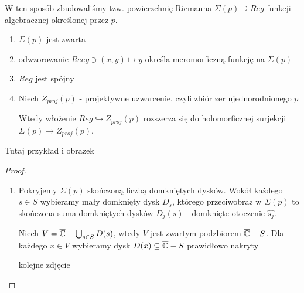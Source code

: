 W ten sposób zbudowaliśmy tzw. powierzchnię Riemanna $\Sigma(p)\supseteq Reg$ funkcji algebracznej określonej przez $p$.

\begin{theorem}{}{}
  \begin{enumerate}
    \item $\Sigma(p)$ jest zwarta
    \item odwzorowanie $Reeg\ni (x,y)\mapsto y$ określa meromorficzną funkcję na $\Sigma(p)$
    \item $Reg$ jest spójny
    \item Niech $Z_{proj}(p)$ - projektywne uzwarcenie, czyli zbiór zer ujednorodnionego $p$

      Wtedy włożenie $Reg\hookrightarrow Z_{proj}(p)$ rozszerza się do holomorficznej surjekcji $\Sigma(p)\to Z_{proj}(p)$.
  \end{enumerate}
\end{theorem}

Tutaj przykład i obrazek

\begin{proof}
  \begin{enumerate}
    \item Pokryjemy $\Sigma(p)$ skończoną liczbą domkniętych dysków. Wokół każdego $s\in S$ wybieramy mały domknięty dysk $D_s$, którego przeciwobraz w $\Sigma(p)$ to skończona suma domkniętych dysków $D_j(s)$ - domknięte otoczenie $\hat{s_j}$.

      Niech $V=\overline{\mathbb{C}}-\bigcup_{s\in S}D(s)$, wtedy $\overline{V}$ jest zwartym podzbiorem $\overline{\mathbb{C}}-S$. Dla każdego $x\in\overline{V}$ wybieramy dysk $D(x)\subseteq\overline{\mathbb{C}}-S$ prawidłowo nakryty
      
      kolejne zdjęcie
  \end{enumerate}
\end{proof}


